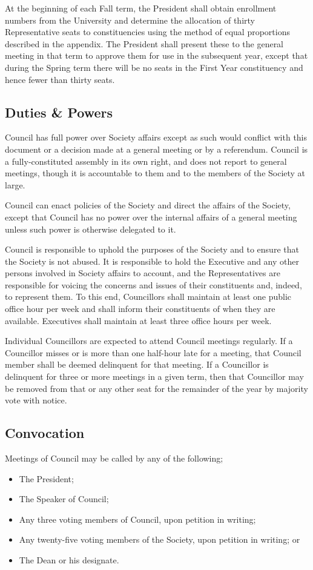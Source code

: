 At the beginning of each Fall term, the President shall obtain enrollment
numbers from the University and determine the allocation of thirty
Representative seats to constituencies using the method of equal proportions
described in the appendix. The President shall present these to the general
meeting in that term to approve them for use in the subsequent year, except that
during the Spring term there will be no seats in the First Year constituency and
hence fewer than thirty seats.

\subsection{Duties \& Powers}
Council has full power over Society affairs except as such would conflict with
this document or a decision made at a general meeting or by a referendum.
Council is a fully-constituted assembly in its own right, and does not report to
general meetings, though it is accountable to them and to the members of the
Society at large.

Council can enact policies of the Society and direct the affairs of the Society,
except that Council has no power over the internal affairs of a general meeting
unless such power is otherwise delegated to it.

Council is responsible to uphold the purposes of the Society and to ensure that
the Society is not abused. It is responsible to hold the Executive and any other
persons involved in Society affairs to account, and the Representatives are
responsible for voicing the concerns and issues of their constituents and,
indeed, to represent them. To this end, Councillors shall maintain at least one
public office hour per week and shall inform their constituents of when they are
available. Executives shall maintain at least three office hours per week.

Individual Councillors are expected to attend Council meetings regularly. If a
Councillor misses or is more than one half-hour late for a meeting, that Council
member shall be deemed delinquent for that meeting. If a Councillor is
delinquent for three or more meetings in a given term, then that Councillor may
be removed from that or any other seat for the remainder of the year by majority
vote with notice.

\subsection{Convocation}
Meetings of Council may be called by any of the following;
\begin{itemize}
  \item The President;
  \item The Speaker of Council;
  \item Any three voting members of Council, upon petition in writing;
  \item Any twenty-five voting members of the Society, upon petition in writing;
    or
  \item The Dean or his designate.
\end{itemize}

